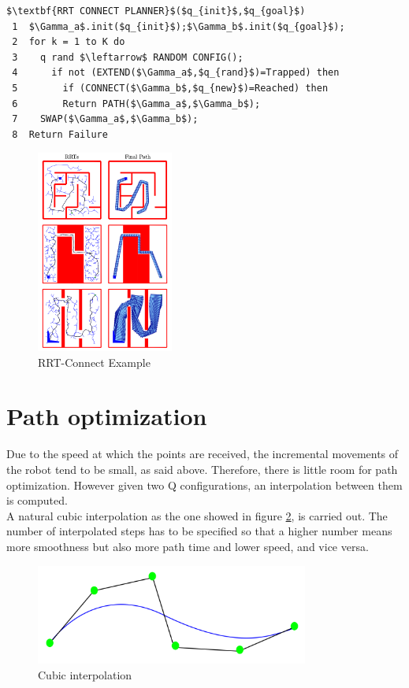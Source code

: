 \begin{lstlisting}[frame=tb, mathescape=true,xleftmargin=.13\textwidth, xrightmargin=.13\textwidth]
$\textbf{RRT CONNECT PLANNER}$($q_{init}$,$q_{goal}$)
 1  $\Gamma_a$.init($q_{init}$);$\Gamma_b$.init($q_{goal}$);
 2  for k = 1 to K do
 3    q rand $\leftarrow$ RANDOM CONFIG();
 4      if not (EXTEND($\Gamma_a$,$q_{rand}$)=Trapped) then
 5        if (CONNECT($\Gamma_b$,$q_{new}$)=Reached) then
 6        Return PATH($\Gamma_a$,$\Gamma_b$);
 7    SWAP($\Gamma_a$,$\Gamma_b$);
 8  Return Failure
\end{lstlisting}

\begin{figure}[!ht]
	\centering
	\includegraphics[width=0.4\textwidth]{figures/rrt_connect}
	\caption{RRT-Connect Example}
	\label{fig:rrt_connect}
\end{figure}

\section{Path optimization} %
\label{sec:path_optimization}
Due to the speed at which the points are received, the incremental movements of the robot tend to be small, as said above. Therefore, there is little room for path optimization. However given two Q configurations, an interpolation between them is computed.\\

A natural cubic interpolation as the one showed in figure \ref{fig:cubic interpolation}, is carried out. The number of interpolated steps has to be specified so that a higher number means more smoothness but also more path time and lower speed, and vice versa.

\begin{figure}[!hb]
	\centering
	\includegraphics[width=0.8\textwidth]{figures/cubic_interpolation}
	\caption{Cubic interpolation}
	\label{fig:cubic interpolation}
\end{figure}

